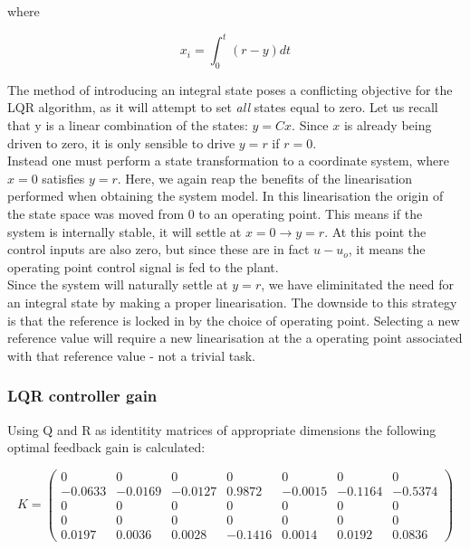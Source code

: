 where

\begin{equation}
	x_i = \int_{0}^{t}(r-y)dt
\end{equation}

The method of introducing an integral state poses a conflicting objective for the LQR algorithm, as it will attempt to set \textit{all} states equal to zero. Let us recall that y is a linear combination of the states: $y = Cx$. Since $x$ is already being driven to zero, it is only sensible to drive $y=r$ if $r=0$.\\



Instead one must perform a state transformation to a coordinate system, where $x=0$ satisfies $y=r$. Here, we again reap the benefits of the linearisation performed when obtaining the system model. In this linearisation the origin of the state space was moved from 0 to an operating point. This means if the system is internally stable, it will settle at $x=0 \rightarrow y=r$. At this point the control inputs are also zero, but since these are in fact $u-u_o$, it means the operating point control signal is fed to the plant. \\

Since the system will naturally settle at $y=r$, we have eliminitated the need for an integral state by making a proper linearisation. The downside to this strategy is that the reference is locked in by the choice of operating point. Selecting a new reference value will require a new linearisation at the a operating point associated with that reference value - not a trivial task.

\subsubsection{LQR controller gain}

Using Q and R as identitity matrices of appropriate dimensions the following optimal feedback gain is calculated:

\begin{equation}
	K = \left(\begin{array}{ccccccc}
		0 & 0 & 0 & 0 & 0 & 0 & 0\\
		-0.0633 & -0.0169 & -0.0127 & 0.9872 & -0.0015 & -0.1164 & -0.5374\\
		0 & 0 & 0 & 0 & 0 & 0 & 0\\
		0 & 0 & 0 & 0 & 0 & 0 & 0\\
		0.0197 & 0.0036 & 0.0028 & -0.1416 & 0.0014 & 0.0192 & 0.0836
	\end{array}\right)
\end{equation}

